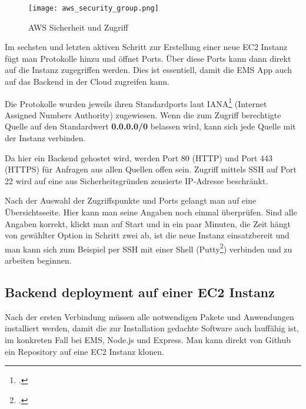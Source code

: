 \begin{center}
\begin{figure}[H]
    \centering
    \texttt{[image: aws\_security\_group.png]}
    \caption{AWS Sicherheit und Zugriff}
\end{figure}
\end{center}
Im sechsten und letzten aktiven Schritt zur Erstellung einer neue EC2 Instanz fügt man Protokolle hinzu und öffnet Ports.
Über diese Ports kann dann direkt auf die Instanz zugegriffen werden. Dies ist essentiell, damit die EMS App auch auf das Backend in der Cloud zugreifen kann.

Die Protokolle wurden jeweils ihren Standardports laut IANA\footcite{iana} (Internet Assigned Numbers Authority) zugewiesen.
Wenn die zum Zugriff berechtigte Quelle auf den Standardwert \textbf{0.0.0.0/0} belassen wird, kann sich jede Quelle mit der Instanz verbinden.

Da hier ein Backend gehostet wird, werden Port 80 (HTTP) und Port 443 (HTTPS) für Anfragen aus allen Quellen offen sein. Zugriff mittels SSH auf Port 22 wird auf eine aus Sicherheitsgründen zensierte IP-Adresse beschränkt.

Nach der Auswahl der Zugriffspunkte und Ports gelangt man auf eine Übersichtsseite.
Hier kann man seine Angaben noch einmal überprüfen.
Sind alle Angaben korrekt, klickt man auf Start und in ein paar Minuten, die Zeit hängt von gewählter Option in Schritt zwei ab, ist die neue Instanz einsatzbereit und man kann sich zum Beispiel per SSH mit einer Shell (Putty\footcite{putty}) verbinden und zu arbeiten beginnen.

\subsection{Backend deployment auf einer EC2 Instanz}
Nach der ersten Verbindung müssen alle notwendigen Pakete und Anwendungen installiert werden, damit die zur Installation gedachte Software auch lauffähig ist,
im konkreten Fall bei EMS, Node.js und Express. Man kann direkt von Github ein Repository auf eine EC2 Instanz klonen. 


